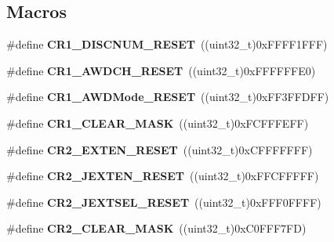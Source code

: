 \subsection*{Macros}
\begin{DoxyCompactItemize}
\item 
\#define {\bfseries C\+R1\+\_\+\+D\+I\+S\+C\+N\+U\+M\+\_\+\+R\+E\+S\+ET}~((uint32\+\_\+t)0x\+F\+F\+F\+F1\+F\+F\+F)\hypertarget{group___a_d_c_gad932677d27cc1bb327c35adabfe2381f}{}\label{group___a_d_c_gad932677d27cc1bb327c35adabfe2381f}

\item 
\#define {\bfseries C\+R1\+\_\+\+A\+W\+D\+C\+H\+\_\+\+R\+E\+S\+ET}~((uint32\+\_\+t)0x\+F\+F\+F\+F\+F\+F\+E0)\hypertarget{group___a_d_c_ga7ad38f78fe4f6b0536c5a98c07c9bffe}{}\label{group___a_d_c_ga7ad38f78fe4f6b0536c5a98c07c9bffe}

\item 
\#define {\bfseries C\+R1\+\_\+\+A\+W\+D\+Mode\+\_\+\+R\+E\+S\+ET}~((uint32\+\_\+t)0x\+F\+F3\+F\+F\+D\+F\+F)\hypertarget{group___a_d_c_ga8f64812f72e97a4bdd27684e20a79c39}{}\label{group___a_d_c_ga8f64812f72e97a4bdd27684e20a79c39}

\item 
\#define {\bfseries C\+R1\+\_\+\+C\+L\+E\+A\+R\+\_\+\+M\+A\+SK}~((uint32\+\_\+t)0x\+F\+C\+F\+F\+F\+E\+F\+F)\hypertarget{group___a_d_c_ga8d425258898b4af4ebc820f52635fad8}{}\label{group___a_d_c_ga8d425258898b4af4ebc820f52635fad8}

\item 
\#define {\bfseries C\+R2\+\_\+\+E\+X\+T\+E\+N\+\_\+\+R\+E\+S\+ET}~((uint32\+\_\+t)0x\+C\+F\+F\+F\+F\+F\+F\+F)\hypertarget{group___a_d_c_ga4df1935a73fac1021d127cd06f33b840}{}\label{group___a_d_c_ga4df1935a73fac1021d127cd06f33b840}

\item 
\#define {\bfseries C\+R2\+\_\+\+J\+E\+X\+T\+E\+N\+\_\+\+R\+E\+S\+ET}~((uint32\+\_\+t)0x\+F\+F\+C\+F\+F\+F\+F\+F)\hypertarget{group___a_d_c_gac33c62d66b5298288f0465c550e4891b}{}\label{group___a_d_c_gac33c62d66b5298288f0465c550e4891b}

\item 
\#define {\bfseries C\+R2\+\_\+\+J\+E\+X\+T\+S\+E\+L\+\_\+\+R\+E\+S\+ET}~((uint32\+\_\+t)0x\+F\+F\+F0\+F\+F\+F\+F)\hypertarget{group___a_d_c_ga086e0cc4e32b2448cab2b5ba6d0651fb}{}\label{group___a_d_c_ga086e0cc4e32b2448cab2b5ba6d0651fb}

\item 
\#define {\bfseries C\+R2\+\_\+\+C\+L\+E\+A\+R\+\_\+\+M\+A\+SK}~((uint32\+\_\+t)0x\+C0\+F\+F\+F7\+F\+D)\hypertarget{group___a_d_c_ga0ff3ffaedfe4137d35d9a975213a37a9}{}\label{group___a_d_c_ga0ff3ffaedfe4137d35d9a975213a37a9}


\end{DoxyCompactItemize}
